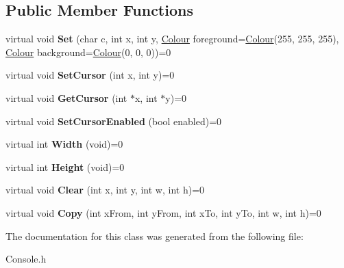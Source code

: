 \subsection*{Public Member Functions}
\begin{DoxyCompactItemize}
\item 
\mbox{\label{class_console_driver_ae382db5f8a03cd3eb6640668c94189c5}} 
virtual void {\bfseries Set} (char c, int x, int y, \hyperlink{class_console_driver_1_1_colour}{Colour} foreground=\hyperlink{class_console_driver_1_1_colour}{Colour}(255, 255, 255), \hyperlink{class_console_driver_1_1_colour}{Colour} background=\hyperlink{class_console_driver_1_1_colour}{Colour}(0, 0, 0))=0
\item 
\mbox{\label{class_console_driver_a5916d27374f57f5863a6ab5792b24ad6}} 
virtual void {\bfseries Set\+Cursor} (int x, int y)=0
\item 
\mbox{\label{class_console_driver_a0aefc44f4a7229bfe97be086730d8fbe}} 
virtual void {\bfseries Get\+Cursor} (int $\ast$x, int $\ast$y)=0
\item 
\mbox{\label{class_console_driver_a09b75ec7e0714377eac28956d51e0eae}} 
virtual void {\bfseries Set\+Cursor\+Enabled} (bool enabled)=0
\item 
\mbox{\label{class_console_driver_a2b801652c81112e4d2bc97f448f50166}} 
virtual int {\bfseries Width} (void)=0
\item 
\mbox{\label{class_console_driver_a010fedf93a07c9580a9d37fdb140536c}} 
virtual int {\bfseries Height} (void)=0
\item 
\mbox{\label{class_console_driver_ac2cfde067e13c06d4e6b4abcc90357a1}} 
virtual void {\bfseries Clear} (int x, int y, int w, int h)=0
\item 
\mbox{\label{class_console_driver_a9d800bcf721d58b1c536bf99b7abc40e}} 
virtual void {\bfseries Copy} (int x\+From, int y\+From, int x\+To, int y\+To, int w, int h)=0
\end{DoxyCompactItemize}


The documentation for this class was generated from the following file\+:\begin{DoxyCompactItemize}
\item 
Console.\+h\end{DoxyCompactItemize}

